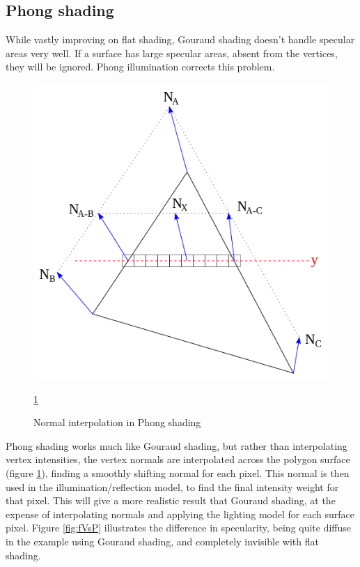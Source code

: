 \subsection{Phong shading}
While vastly improving on flat shading, Gouraud shading doesn't handle specular
areas very well. If a surface has large specular areas, absent from the
vertices, they will be ignored. Phong illumination corrects this problem.

\begin{figure}[hbt]
	\centering
	\scalebox{0.5}
	{\includegraphics{pics/phongInterpol.png}}
	\caption{Normal interpolation in Phong shading}
	\label{fig:phongInterpo}
\ref{fig:phongInterpo}
\end{figure}

Phong shading works much like Gouraud shading, but rather than interpolating
vertex intensities, the vertex normals are interpolated across the polygon
surface (figure \ref{fig:phongInterpo}), finding a smoothly shifting
normal for each pixel. This normal is then used in the illumination/reflection
model, to find the final intensity weight for that pixel. This will give a more
realistic result that Gouraud shading, at the expense of interpolating normals and
applying the lighting model for each surface pixel. Figure \ref{fig:fVsP}
illustrates the difference in specularity, being quite diffuse in the example
using Gouraud shading, and completely invisible with flat shading.
